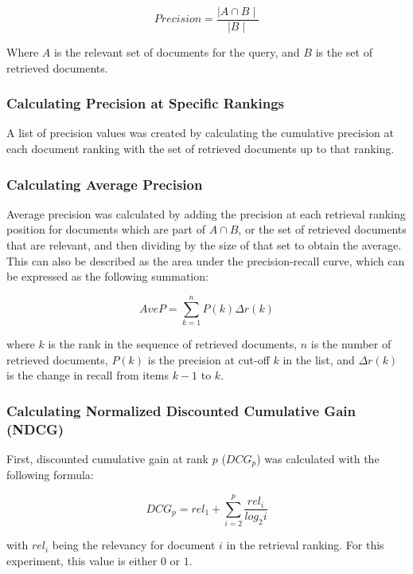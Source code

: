 \begin{equation}
\nonumber
Precision = \frac{\mid A \cap B \mid}{\mid B \mid}
\end{equation}

Where \(A\) is the relevant set of documents for the query, and \(B\) is the set of retrieved documents.


\subsubsection{Calculating Precision at Specific Rankings}
A list of precision values was created by calculating the cumulative precision at each document ranking with the set of retrieved documents up to that ranking.


\subsubsection{Calculating Average Precision}
Average precision was calculated by adding the precision at each retrieval ranking position for documents which are part of \(A \cap B\), or the set of retrieved documents that are relevant, and then dividing by the size of that set to obtain the average.  This can also be described as the area under the precision-recall curve, which can be expressed as the following summation:

\begin{equation}
\nonumber
AveP = \sum_{k=1}^{n} P(k)\Delta r(k)
\end{equation}

where \(k\) is the rank in the sequence of retrieved documents, \(n\) is the number of retrieved documents, \(P(k)\) is the precision at cut-off \(k\) in the list, and \(\Delta r(k)\) is the change in recall from items \(k-1\) to \(k\).


\subsubsection{Calculating Normalized Discounted Cumulative Gain (NDCG)}
First, discounted cumulative gain at rank \(p\) (\(DCG_p\)) was calculated with the following formula:

\begin{equation}
\nonumber
DCG_p = rel_1 + \sum_{i=2}^p \frac{rel_i}{log_2i}
\end{equation}

with \(rel_i\) being the relevancy for document \(i\) in the retrieval ranking.  For this experiment, this value is either \(0\) or \(1\). \\

